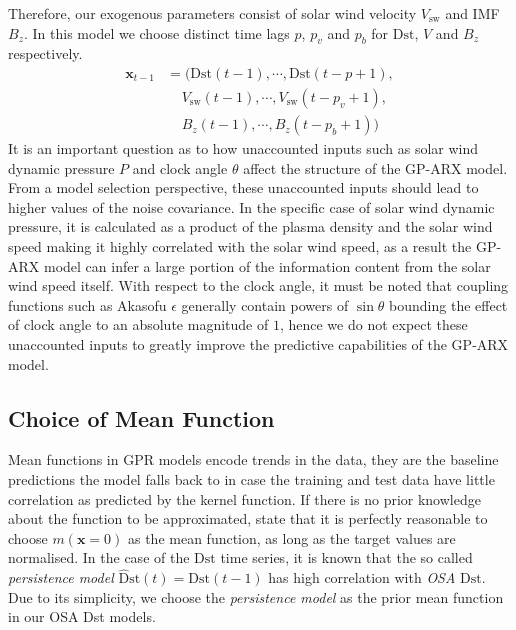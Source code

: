 Therefore, our exogenous parameters consist of solar wind velocity $ V_{\text{sw}}$ and IMF $B_z$. In this model we choose distinct time lags $p$, $p_{v}$ and $p_{b}$ for $\mathrm{Dst}$, $V$ and $B_z$ respectively.
%
\begin{align*}
       \mathbf{x}_{t-1} & = (\mathrm{Dst}(t-1), \cdots , \mathrm{Dst}(t-p+1), \\
        & \ \ \ \ \  V_{\text{sw}}(t-1), \cdots, V_{\text{sw}}(t-p_{v}+1),\\
        & \ \ \ \ \  B_{z}(t-1), \cdots, B_{z}(t-p_{b}+1))
\end{align*}
%
It is an important question as to how unaccounted inputs such as solar wind dynamic pressure $P$ and clock angle $\theta$ affect the structure of the GP-ARX model. From a model selection perspective, these unaccounted inputs should lead to higher values of the noise covariance. In the specific case of solar wind dynamic pressure, it is calculated as a product of the plasma density and the solar wind speed making it highly correlated with the solar wind speed, as a result the GP-ARX model can infer a large portion of the information content from the solar wind speed itself. With respect to the clock angle, it must be noted that coupling functions such as Akasofu $\epsilon$ generally contain powers of $\sin \theta$ bounding the effect of clock angle to an absolute magnitude of $1$, hence we do not expect these unaccounted inputs to greatly improve the predictive capabilities of the GP-ARX model.

\subsection{Choice of Mean Function}

Mean functions in GPR models encode trends in the data, they are the baseline predictions the model falls back to in case the training and test data have little correlation as predicted by the kernel function. If there is no prior knowledge about the function to be approximated, \citet{Rasmussen:2005:GPM:1162254} state that it is perfectly reasonable to choose $ m(\mathbf{x} = 0)$ as the mean function, as long as the target values are normalised. In the case of the $\mathrm{Dst}$ time series, it is known that the so called \emph{persistence model} 
$\mathrm{\hat{D}st}(t) = \mathrm{Dst}(t-1)$ has high correlation with \emph{OSA} $\mathrm{Dst}$. Due to its simplicity, we choose the \emph{persistence model} as the prior mean function in our OSA Dst models. 

